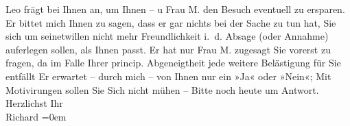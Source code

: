 \begin{ledgroupsized}[t]{13cm}
                  Leo frägt bei Ihnen an, um Ihnen – u Frau
                  M. den Besuch \introOben{}eventuell\introOben{} zu ersparen. Er bittet mich Ihnen zu sagen, dass er gar nichts
               bei der Sache zu tun hat, Sie sich um seinetwillen nicht mehr {\pb}Freundlichkeit i. d. Absage (oder
               Annahme) auferlegen sollen, als  Ihnen passt. Er
               hat nur Frau M. zugesagt Sie vorerst zu
               fragen, da im Falle Ihrer princip. Abgeneigtheit jede weitere Belästigung für Sie
               entfällt\pend
           \pstart
           Er erwartet – durch mich – von Ihnen nur ein »Ja« oder »Nein«; \introOben{}Mit\introOben{} Motivirungen sollen Sie Sich nicht mühen –\pend
           \pstart
           Bitte noch heute um Antwort. Herzlichst\pend
           \pstart
           Ihr{\\[\baselineskip]}\spacefill\mbox{Richard}\pend
           \leftskip=0em{}
         
         \endnumbering{}\end{ledgroupsized}  \newcommand{\dateiname}{L01976}\newcommand{\titel}{Richard Beer-Hofmann an Arthur Schnitzler, 3. 11. 1910}\newcommand{\editorInnen}{Martin Anton Müller und Gerd-Hermann Susen}
      